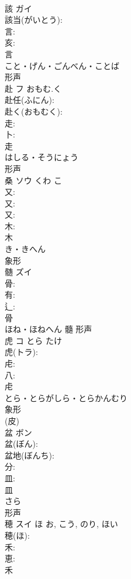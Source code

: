 \documentclass[8pt]{extreport}
\begin{document}
\begin{CJK}{UTF8}{min}
\\	該	ガイ			
\\	該当(がいとう): 
\\	言: 
\\	亥: 
\\	言	
\\	こと・げん・ごんべん・ことば	
\\	形声 
\\	赴	フ	おもむ.く		
\\	赴任(ふにん): 
\\	赴く(おもむく): 
\\	走: 
\\	卜: 
\\	走	
\\	はしる・そうにょう	
\\	形声 
\\	桑	ソウ	くわ	こ	
\\	又: 
\\	又: 
\\	又: 
\\	木: 
\\	木	
\\	き・きへん	
\\	象形 
\\	髄	ズイ			
\\	骨: 
\\	有: 
\\	辶: 
\\	骨	
\\	ほね・ほねへん	髓	形声 
\\	虎	コ	とら	たけ	
\\	虎(トラ): 
\\	虍: 
\\	八: 
\\	虍	
\\	とら・とらがしら・とらかんむり	
\\	象形 
\\	(皮) 
\\	盆	ボン			
\\	盆(ぼん): 
\\	盆地(ぼんち): 
\\	分: 
\\	皿: 
\\	皿	
\\	さら	
\\	形声 
\\	穂	スイ	ほ	お, こう, のり, ほい	
\\	穂(ほ): 
\\	禾: 
\\	恵: 
\\	禾	

\end{CJK}
\end{document}
